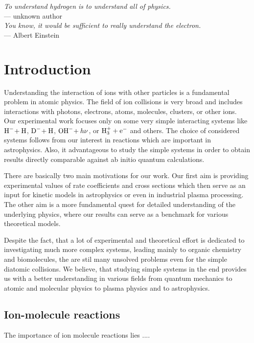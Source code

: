 \begin{flushright}
\textsl{To understand hydrogen is to understand all of physics.}\\
 \medskip{}
 --- unknown author \\
\bigskip{}
\textsl{You know, it would be sufficient to really understand the electron.}\\
 \medskip{}
 --- Albert Einstein
\par\end{flushright}

\bigskip{}
\begingroup
\let\clearpage\relax
\let\cleardoublepage\relax


\chapter{Introduction}

\label{ch:Introduction}
Understanding the interaction of ions with other particles is a
fundamental problem in atomic physics. The field of ion collisions
is very broad and includes interactions with photons, electrons,
atoms, molecules, clusters, or other ions. Our experimental work
focuses only on some very simple interacting systems like
${\text{H}^-\!}+{\text{H}}$,
${\text{D}^-\!}+{\text{H}}$, ${\text{OH}^-\!}+h\nu$, or ${\text{H}^+_3}+{\text{e}^-}$ and others. The
choice of considered systems follows from our interest in reactions
which are important in astrophysics. Also, it advantageous to study
the simple systems in order to obtain results directly comparable
against ab initio quantum calculations.

There are basically two main motivations for our work. Our first
aim is providing experimental values of rate coefficients and
cross sections which then serve as an input for kinetic models
in astrophysics or even in industrial plasma processing. The
other aim is a more fundamental quest for detailed understanding
of the underlying physics, where our results can serve as a benchmark
for various theoretical models.

Despite the fact, that a lot of experimental and theoretical effort
is dedicated to investigating much more complex systems, leading
mainly to organic chemistry and biomolecules, the are stil many
unsolved problems even for the simple diatomic collisions. We
believe, that studying simple systems in the end provides
us with a better understanding in various fields from quantum mechanics
to atomic and molecular physics to plasma physics and to astrophysics.

\section{Ion-molecule reactions}
The importance of ion molecule reactions lies ....

